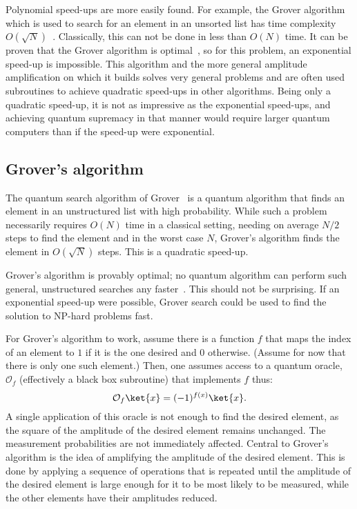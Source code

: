 
Polynomial speed-ups are more easily found.
For example, the Grover algorithm which is used to search for an element in an unsorted list has time complexity $O(\sqrt{N})$~\autocite{grover1996}.
Classically, this can not be done in less than $O(N)$ time.
It can be proven that the Grover algorithm is optimal~\autocite{zalka1999}, so for this problem, an exponential speed-up is impossible.
This algorithm and the more general amplitude amplification on which it builds solves very general problems and are often used subroutines to achieve quadratic speed-ups in other algorithms.
Being only a quadratic speed-up, it is not as impressive as the exponential speed-ups, and achieving quantum supremacy in that manner would require larger quantum computers than if the speed-up were exponential.

\subsection{Grover's algorithm}
The quantum search algorithm of Grover~\autocite{grover1996} is a quantum algorithm that finds an element in an unstructured list with high probability.
While such a problem necessarily requires $O(N)$ time in a classical setting, needing on average $N/2$ steps to find the element and in the worst case $N$, Grover's algorithm finds the element in $O(\sqrt{N})$ steps.
This is a quadratic speed-up.

Grover's algorithm is provably optimal; no quantum algorithm can perform such general, unstructured searches any faster~\autocite{zalka1999}.
This should not be surprising.
If an exponential speed-up were possible, Grover search could be used to find the solution to NP-hard problems fast.

For Grover's algorithm to work, assume there is a function $f$ that maps the index of an element to $1$ if it is the one desired and $0$ otherwise.
(Assume for now that there is only one such element.)
Then, one assumes access to a quantum oracle, $\mathcal{O}_f$
(effectively a black box subroutine) that implements $f$ thus:
\begin{equation}
    \label{eq:grover_oracle}
    \mathcal{O}_f \ket{x} = (-1)^{f(x)} \ket{x}.
\end{equation}
A single application of this oracle is not enough to find the desired element, as the square of the amplitude of the desired element remains unchanged.
The measurement probabilities are not immediately affected.
Central to Grover's algorithm is the idea of amplifying the amplitude of the desired element.
This is done by applying a sequence of operations that is repeated until the amplitude of the desired element is large enough for it to be most likely to be measured, while the other elements have their amplitudes reduced.

